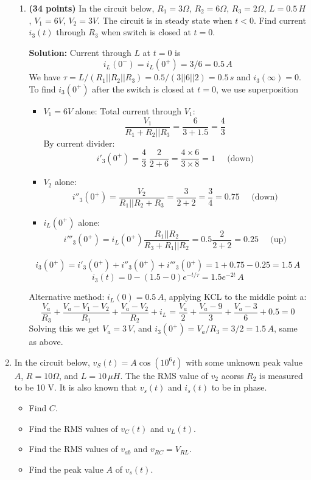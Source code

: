 \begin{enumerate}
\begin{enumerate}
\item  {\bf (34 points)} 
  In the circuit below, $R_1=3\Omega$, $R_2=6\Omega$, $R_3=2\Omega$, 
  $L=0.5\,H$, $V_1=6V$, $V_2=3V$. The circuit is in steady state when 
  $t<0$. Find current $i_3(t)$ through $R_3$ when switch is closed at
  $t=0$.


  {\bf Solution:} Current through $L$ at $t=0$ is
  \[
  i_L(0^-)=i_L(0^+)=3/6=0.5\,A
  \]
  We have $\tau=L/(R_1||R_2||R_3)=0.5/(3||6||2)=0.5\,s$ and $i_3(\infty)=0$.
  To find $i_3(0^+)$ after the switch is closed at $t=0$, we use 
  superposition
  \begin{itemize}
  \item $V_1=6V$ alone: Total current through $V_1$:
    \[
    \frac{V_1}{R_1+R_2||R_3}=\frac{6}{3+1.5}=\frac{4}{3}
    \]
    By current divider:
    \[
    i'_3(0^+)=\frac{4}{3}\;\frac{2}{2+6}=\frac{4\times 6}{3\times 8}=1\;\;\;\;\;\mbox{(down)}
    \]
  \item $V_2$ alone: 
    \[
    i''_3(0^+)=\frac{V_2}{R_1||R_2+R_3}=\frac{3}{2+2}=\frac{3}{4}=0.75\;\;\;\;\;\mbox{(down)}
    \]
  \item $i_L(0^+)$ alone:
    \[
    i'''_3(0^+)=i_L(0^+)\frac{R_1||R_2}{R_3+R_1||R_2}=0.5\frac{2}{2+2}=0.25\;\;\;\;\;\mbox{(up)}
    \]
  \end{itemize}
  \[
  i_3(0^+)=i'_3(0^+)+i''_3(0^+)+i'''_3(0^+)=1+0.75-0.25=1.5\,A
  \]
  \[
  i_3(t)=0-(1.5-0)e^{-t/\tau}=1.5e^{-2t}\,A
  \]

  Alternative method: $i_L(0)=0.5\,A$, applying KCL to the middle point a:
  \[
  \frac{V_a}{R_3}+\frac{V_a-V_1-V_2}{R_1}+\frac{V_a-V_2}{R_2}+i_L
  =\frac{V_a}{2}+\frac{V_a-9}{3}+\frac{V_a-3}{6}+0.5=0
  \]
  Solving this we get $V_a=3\,V$, and $i_3(0^+)=V_a/R_3=3/2=1.5\,A$, same
  as above.

\end{enumerate}





\item In the circuit below, $v_S(t)=A\cos(10^6 t)$ with some unknown
  peak value $A$, $R=10\Omega$, and $L=10\,\mu H$. The the RMS value
  of $v_2$ acorss $R_2$ is measured to be 10 V. It is also known that
  $v_s(t)$ and $i_s(t)$ to be in phase. 
  \begin{itemize}
  \item Find $C$.
  \item Find the RMS values of $v_C(t)$ and $v_L(t)$.
  \item Find the RMS values of $v_{ab}$ and $v_{RC}=V_{RL}$.
  \item Find the peak value $A$ of $v_s(t)$.
  \end{itemize}


\end{enumerate}
